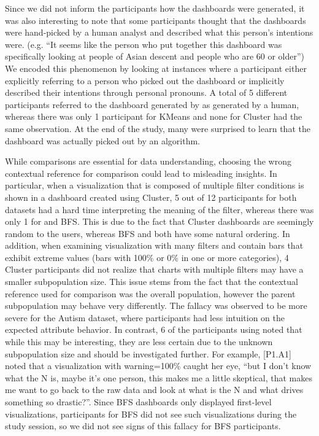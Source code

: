 \par Since we did not inform the participants how the dashboards were generated, it was also interesting to note that some participants thought that the dashboards were hand-picked by a human analyst and described what this person's intentions were. (e.g. ``It seems like the person who put together this dashboard was specifically looking at people of Asian descent and people who are 60 or older'') We encoded this phenomenon by looking at instances where a participant either explicitly referring to a person who picked out the dashboard or implicitly described their intentions through personal pronouns. A total of 5 different participants referred to the dashboard generated by \system as generated by a human, whereas there was only 1 participant for KMeans and none for Cluster had the same observation. At the end of the study, many were surprised to learn that the \system dashboard was actually picked out by an algorithm.

\npar While comparisons are essential for data understanding, choosing the wrong contextual reference for comparison could lead to misleading insights. In particular, when a visualization that is composed of multiple filter conditions is shown in a dashboard created using Cluster, 5 out of 12 participants for both datasets had a hard time interpreting the meaning of the filter, whereas there was only 1 for \system and BFS. This is due to the fact that Cluster dashboards are seemingly random to the users, whereas BFS and \system both have some natural ordering. In addition, when examining visualization with many filters and contain bars that exhibit extreme values (bars with 100\% or 0\% in one or more categories), 4 Cluster participants did not realize that charts with multiple filters may have a smaller subpopulation size. This issue stems from the fact that the contextual reference used for comparison was the overall population, however the parent subpopulation may behave very differently. The fallacy was observed to be more severe for the Autism dataset, where participants had less intuition on the expected attribute behavior. In contrast, 6 of the participants using \system noted that while this may be interesting, they are less certain due to the unknown subpopulation size and should be investigated further. For example, [P1.A1] noted that a visualization with warning=100\% caught her eye, ``but I don't know what the N is, maybe it's one person, this makes me a little skeptical, that makes me want to go back to the raw data and look at what is the N and what drives something so drastic?''. Since BFS dashboards only displayed first-level visualizations, participants for BFS did not see such visualizations during the study session, so we did not see signs of this fallacy for BFS participants.

